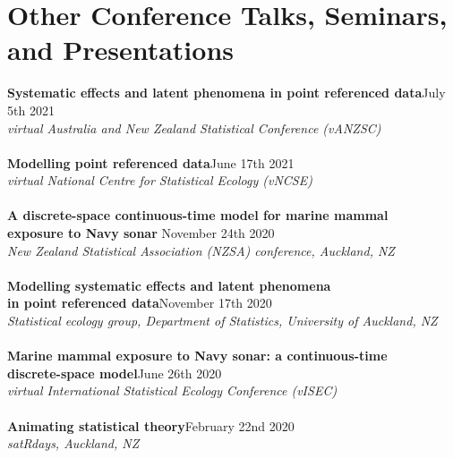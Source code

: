 \documentclass[10pt,letter]{article}
\begin{document}
\section*{Other Conference Talks, Seminars, and Presentations}
\vspace{1mm}
 {\textbf{Systematic effects and latent phenomena in point referenced data}}\hfill July 5th 2021\\
                 {\sl virtual Australia and New Zealand Statistical Conference (vANZSC)}\\
                 \hdashrule[0.5ex]{4cm}{1pt}{1pt}\\
                  {\textbf{Modelling point referenced data}}\hfill June 17th 2021\\
                 {\sl virtual National Centre for Statistical Ecology (vNCSE)}\\
                 \hdashrule[0.5ex]{4cm}{1pt}{1pt}\\
{\textbf{A discrete-space continuous-time model for marine mammal \\
           exposure to Navy sonar }}\hfill November 24th 2020\\
       {\sl New Zealand Statistical Association (NZSA) conference, Auckland, NZ}\\
       \hdashrule[0.5ex]{4cm}{1pt}{1pt}\\
{\textbf{Modelling systematic effects and latent phenomena \\
                     in point referenced data}}\hfill November 17th 2020\\
                 {\sl Statistical ecology group, Department of Statistics, University of Auckland, NZ}\\
                 \hdashrule[0.5ex]{4cm}{1pt}{1pt}\\
{\textbf{Marine mammal exposure to Navy sonar: a continuous-time \\
                     discrete-space model}}\hfill June 26th 2020\\
                 {\sl virtual International Statistical Ecology Conference (vISEC)}\\
                 \hdashrule[0.5ex]{4cm}{1pt}{1pt}\\
                           {\textbf{Animating statistical theory}}\hfill February 22nd 2020\\
                           {\sl satRdays, Auckland, NZ}\\
\end{document}
